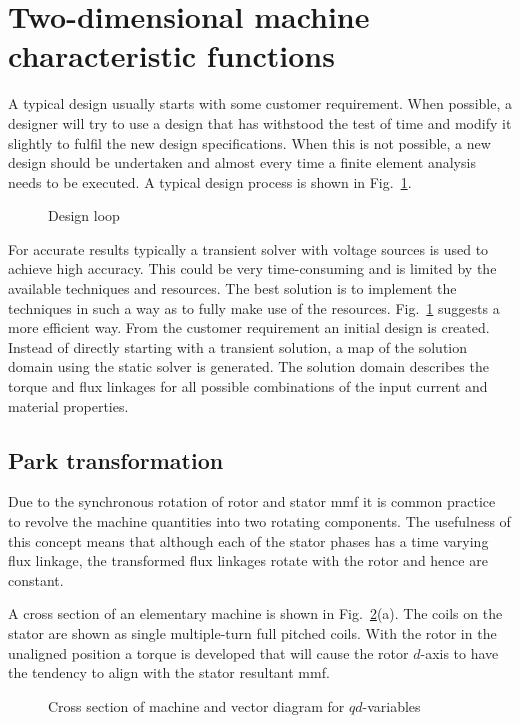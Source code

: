 \section{Two-dimensional machine characteristic functions}
A typical design usually starts with some customer requirement. When possible, a designer will try to use a design that has withstood the test of time and modify it slightly to fulfil the new design specifications. When this is not possible, a new design should be undertaken and almost every time a finite element analysis needs to be executed. A typical design process is shown in Fig.~\ref{fig:Main_design_loop}.
\begin{figure}
	\centering
	
	\vspace{0.2cm}
	
  \caption{Design loop}
	\label{fig:Main_design_loop}
\end{figure} 
For accurate results typically a transient solver with voltage sources is used to achieve high accuracy. This could be very time-consuming and is limited by the available techniques and resources. The best solution is to implement the techniques in such a way as to fully make use of the resources. Fig.~\ref{fig:Main_design_loop} suggests a more efficient way. From the customer requirement an initial design is created. Instead of directly starting with a transient solution, a map of the solution domain using the static solver is generated. The solution domain describes the torque and flux linkages for all possible combinations of the input current and material properties.

\subsection{Park transformation}
Due to the synchronous rotation of rotor and stator mmf it is common practice to revolve the machine quantities into two rotating components. The usefulness of this concept means that although each of the stator phases has a time varying flux linkage, the transformed flux linkages rotate with the rotor and hence are constant. 

A cross section of an elementary machine is shown in Fig.~\ref{fig:qd_transform}(a). The coils on the stator are shown as single multiple-turn full pitched coils. With the rotor in the unaligned position a torque is developed that will cause the rotor $d$-axis to have the tendency to align with the stator resultant mmf.     
\begin{figure}[htbp]
	\centering
		
		\caption{Cross section of machine and vector diagram for $qd$-variables}
		\label{fig:qd_transform}
\end{figure}

